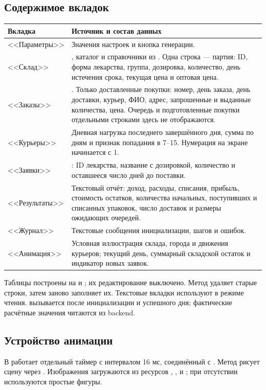 \subsection{Содержимое вкладок}
\begin{longtable}{@{}L{0.22\textwidth}L{0.71\textwidth}@{}}
\toprule
Вкладка & Источник и состав данных \\
\midrule
\endhead
<<Параметры>> & Значения настроек и кнопка генерации. \\
<<Склад>> & , каталог и справочники из
. Одна строка --- партия: ID, форма лекарства, группа,
дозировка, количество, день истечения срока, текущая цена и оптовая цена. \\
<<Заказы>> & . Только доставленные
покупки: номер, день заказа, день доставки, курьер, ФИО, адрес, запрошенные
и выданные количества, цена. Очередь и подготовленные покупки отдельными
строками здесь не отображаются. \\
<<Курьеры>> & Дневная нагрузка последнего завершённого дня, сумма по дням
и признак попадания в 7--15. Нумерация на экране начинается с 1. \\
<<Заявки>> & : ID лекарства, название с дозировкой,
количество и оставшееся число дней до поставки. \\
<<Результаты>> & Текстовый отчёт: доход, расходы, списания, прибыль,
стоимость остатков, количества начальных, поступивших и списанных упаковок,
число доставок и размеры ожидающих очередей. \\
<<Журнал>> & Текстовые сообщения инициализации, шагов и ошибок. \\
<<Анимация>> & Условная иллюстрация склада, города и движения курьеров;
текущий день, суммарный складской остаток и индикатор новых заявок. \\
\bottomrule
\end{longtable}

Таблицы построены на  и ;
их редактирование выключено. Метод  удаляет старые строки,
затем заново заполняет их. Текстовые вкладки используют 
в режиме чтения.  вызывается после инициализации
и успешного дня; фактические расчётные значения читаются из backend.

\subsection{Устройство анимации}
В  работает отдельный таймер с интервалом 16 мс,
соединённый с . Метод  рисует сцену
через . Изображения  загружаются из ресурсов
, , 
и ; при отсутствии используются простые фигуры.

